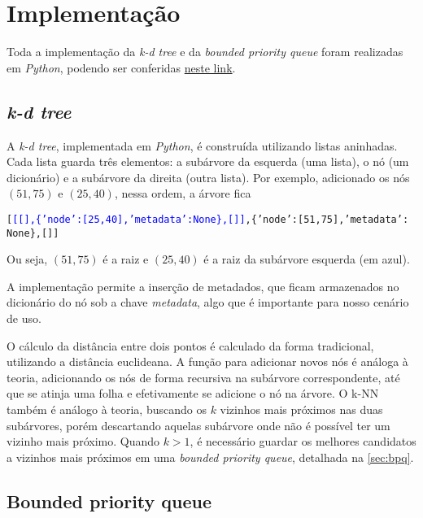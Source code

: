 \section{Implementação}

    Toda a implementação da \textit{k-d tree} e da \textit{bounded priority queue} foram realizadas em \textit{Python}, podendo ser conferidas \href{https://github.com/lucasresck/data-structures-algorithms/blob/main/trees/scripts/k_d_tree.py}{neste link}.

    \subsection{\textit{k-d tree}}

        A \textit{k-d tree}, implementada em \textit{Python}, é construída utilizando listas aninhadas. Cada lista guarda três elementos: a subárvore da esquerda (uma lista), o nó (um dicionário) e a subárvore da direita (outra lista). Por exemplo, adicionado os nós $(51, 75)$ e $(25, 40)$, nessa ordem, a árvore fica        
        \begin{alltt}
[\textcolor{blue}{[[], \{'node': [25, 40], 'metadata': None\}, []]}, \{'node': [51, 75], 'metadata':
None\}, []]
        \end{alltt}
        Ou seja, $(51, 75)$ é a raiz e $(25, 40)$ é a raiz da subárvore esquerda (em azul).

        A implementação permite a inserção de metadados, que ficam armazenados no dicionário do nó sob a chave \textit{metadata}, algo que é importante para nosso cenário de uso.
        
        O cálculo da distância entre dois pontos é calculado da forma tradicional, utilizando a distância euclideana. 
        A função para adicionar novos nós é análoga à teoria, adicionando os nós de forma recursiva na subárvore correspondente, até que se atinja uma folha e efetivamente se adicione o nó na árvore. O k-NN também é análogo à teoria, buscando os $k$ vizinhos mais próximos nas duas subárvores, porém descartando aquelas subárvore onde não é possível ter um vizinho mais próximo. Quando $k > 1$, é necessário guardar os melhores candidatos a vizinhos mais próximos em uma \textit{bounded priority queue}, detalhada na \autoref{sec:bpq}.

    \subsection{Bounded priority queue}
        \label{sec:bpq}

